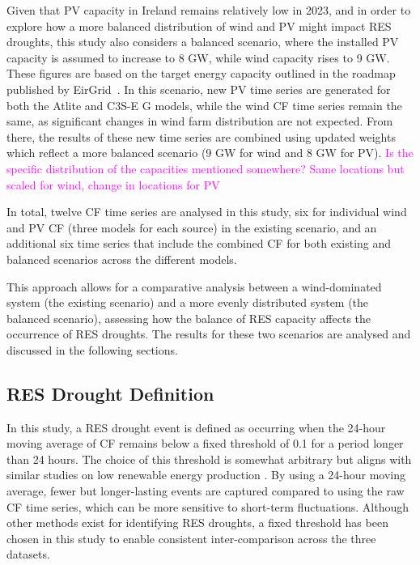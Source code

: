 \documentclass[a4paper, 11pt]{article}
\begin{document}
Given that PV capacity in Ireland remains relatively low in 2023, and in order to explore how a more balanced distribution of wind and PV might impact RES droughts, this study also considers a balanced scenario, where the installed PV capacity is assumed to increase to 8 GW, while wind capacity rises to 9 GW. These figures are based on the target energy capacity outlined in the roadmap published by EirGrid~\cite{eirgrid2023future}. In this scenario, new PV time series are generated for both the Atlite and C3S-E G models, while the wind CF time series remain the same, as significant changes in wind farm distribution are not expected. From there, the results of these new time series are combined using updated weights which reflect a more balanced scenario (9 GW for wind and 8 GW for PV). \textcolor{magenta}{Is the specific distribution of the capacities mentioned somewhere? Same locations but scaled for wind, change in locations for PV}

In total, twelve CF time series are analysed in this study, six for individual wind and PV CF (three models for each source) in the existing scenario, and an additional six time series that include the combined CF for both existing and balanced scenarios across the different models.

This approach allows for a comparative analysis between a wind-dominated system (the existing scenario) and a more evenly distributed system (the balanced scenario), assessing how the balance of RES capacity affects the occurrence of RES droughts. The results for these two scenarios are analysed and discussed in the following sections.

\subsection{RES Drought Definition}
\label{sec:res_drought}

In this study, a RES drought event is defined as occurring when the 24-hour moving average of CF remains below a fixed threshold of 0.1 for a period longer than 24 hours. The choice of this threshold is somewhat arbitrary but aligns with similar studies on low renewable energy production \cite{kaspar2019drought, ohba2022drought, mayer2023drought} . By using a 24-hour moving average, fewer but longer-lasting events are captured compared to using the raw CF time series, which can be more sensitive to short-term fluctuations. Although other methods exist for identifying RES droughts, a fixed threshold has been chosen in this study to enable consistent inter-comparison across the three datasets.
\end{document}

